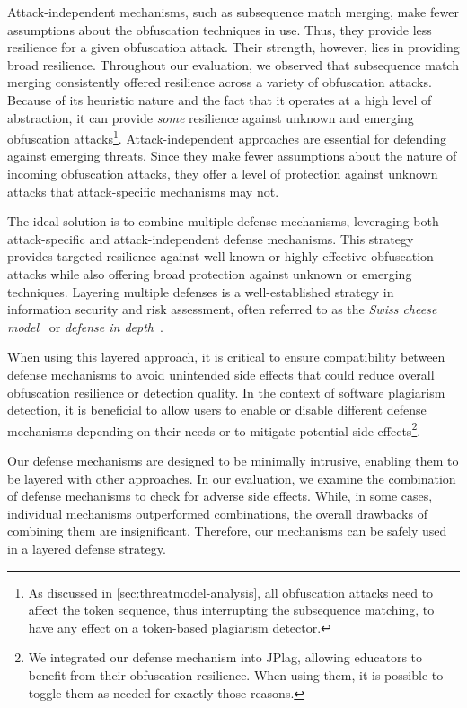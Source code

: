 Attack-independent mechanisms, such as subsequence match merging, make fewer assumptions about the obfuscation techniques in use. Thus, they provide less resilience for a given obfuscation attack. 
Their strength, however, lies in providing broad resilience.
Throughout our evaluation, we observed that subsequence match merging consistently offered resilience across a variety of obfuscation attacks.
Because of its heuristic nature and the fact that it operates at a high level of abstraction, it can provide \textit{some} resilience against unknown and emerging obfuscation attacks\footnote{As discussed in \autoref{sec:threatmodel-analysis}, all obfuscation attacks need to affect the token sequence, thus interrupting the subsequence matching, to have any effect on a token-based plagiarism detector.}.
Attack-independent approaches are essential for defending against emerging threats.
Since they make fewer assumptions about the nature of incoming obfuscation attacks, they offer a level of protection against unknown attacks that attack-specific mechanisms may not.

The ideal solution is to combine multiple defense mechanisms, leveraging both attack-specific and attack-independent defense mechanisms.
This strategy provides targeted resilience against well-known or highly effective obfuscation attacks while also offering broad protection against unknown or emerging techniques.
Layering multiple defenses is a well-established strategy in information security and risk assessment, often referred to as the \textit{Swiss cheese model}~\cite{Reason1990} or \textit{defense in depth}~\cite{Stytz2004, Lippmann2006, Anderson2020}.

When using this layered approach, it is critical to ensure compatibility between defense mechanisms to avoid unintended side effects that could reduce overall obfuscation resilience or detection quality.
In the context of software plagiarism detection, it is beneficial to allow users to enable or disable different defense mechanisms depending on their needs or to mitigate potential side effects\footnote{We integrated our defense mechanism into JPlag, allowing educators to benefit from their obfuscation resilience. When using them, it is possible to toggle them as needed for exactly those reasons.}.

Our defense mechanisms are designed to be minimally intrusive, enabling them to be layered with other approaches.
In our evaluation, we examine the combination of defense mechanisms to check for adverse side effects.
While, in some cases, individual mechanisms outperformed combinations, the overall drawbacks of combining them are insignificant.
Therefore, our mechanisms can be safely used in a layered defense strategy.

